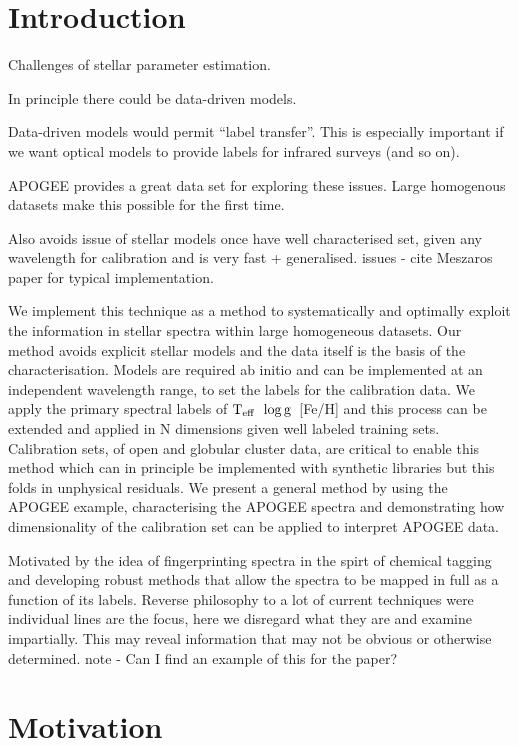 \documentclass[12pt, preprint]{aastex}
\newcommand{\teff}{\mbox{$\rm T_{eff}$}}
\newcommand{\logg}{\mbox{$\rm \log g$}}
\begin{document}
\section{Introduction}

Challenges of stellar parameter estimation.

In principle there could be data-driven models.

Data-driven models would permit ``label transfer''.
This is especially important if we want optical models to provide labels for infrared surveys (and so on).

APOGEE provides a great data set for exploring these issues. Large homogenous datasets make this possible for the first time. 

Also avoids issue of stellar models once have well characterised set, given any wavelength for calibration and is very fast + generalised. 
issues - cite Meszaros paper for typical implementation. 

We implement this technique as a method to systematically and optimally exploit the information in stellar spectra within large homogeneous datasets.  Our method avoids explicit stellar models and the data itself is the basis of the characterisation. Models are required ab initio and can be implemented at an independent wavelength range, to set the labels for the calibration data.  We apply the primary spectral labels of \teff\, \logg\, [Fe/H] and this process can be extended and applied in N dimensions given well labeled training sets. Calibration sets, of open and globular cluster data, are critical to enable this method which can in principle be implemented with synthetic libraries but this folds in unphysical residuals. We present a general method by using the APOGEE example, characterising the APOGEE spectra and demonstrating how dimensionality of the calibration set can be applied to interpret APOGEE data. 

Motivated by the idea of fingerprinting spectra in the spirt of chemical tagging and developing robust methods that allow the spectra to be mapped in full as a function of its labels. Reverse philosophy to a lot of current techniques were individual lines are the focus, here we disregard what they are and examine impartially. This may reveal information that may not be obvious or otherwise determined. note - Can I find an example of this for the paper? 


\section{Motivation}
\end{document}
